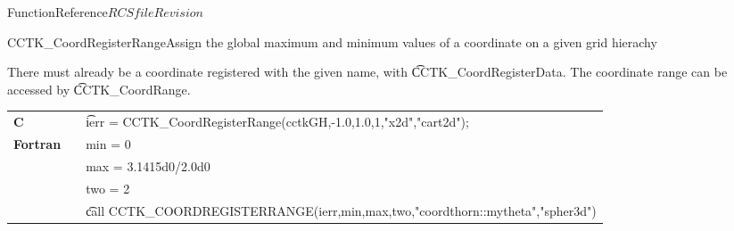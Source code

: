 \begin{cactuspart}{FunctionReference}{$RCSfile$}{$Revision$}
\begin{CCTKFunc}{CCTK\_CoordRegisterRange}{Assign the global maximum and minimum
values of a coordinate on a given grid hierachy}
\label{CCTK-CoordRegisterRange}
\showargs
\begin{params}
\end{params}
\begin{discussion}
There must already
be a coordinate registered with the given name, with {\t CCTK\_CoordRegisterData}.
The coordinate range
can be accessed by {\t CCTK\_CoordRange}.
\end{discussion}
\begin{examples}
\begin{tabular}{@{}p{3cm}cp{11cm}}
\hfill {\bf C} && {\t ierr = CCTK\_CoordRegisterRange(cctkGH,-1.0,1.0,1,"x2d","cart2d")};
\\
\hfill {\bf Fortran} && min = 0
\\
&& max = 3.1415d0/2.0d0
\\
&& two = 2
\\
&&{\t call CCTK\_COORDREGISTERRANGE(ierr,min,max,two,"coordthorn::mytheta","spher3d")}
\\
\end{tabular}
\end{examples}
\begin{errorcodes}
\end{errorcodes}
\end{CCTKFunc}


\end{cactuspart}
